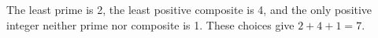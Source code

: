 The least prime is 2, the least positive composite is 4, and the only positive integer neither prime nor composite is 1. These choices give $\boxed{2+4+1=7}$.
